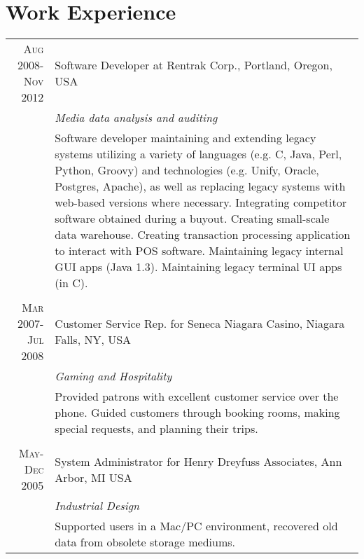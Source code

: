 \documentclass[a4paper,10pt]{article}
\begin{document}
        \section{Work Experience}
        \begin{tabular}{r|p{11cm}}
            \textsc{Aug 2008-Nov 2012}  & Software Developer at Rentrak Corp., Portland, Oregon, USA\\
                                        & \emph{Media data analysis and auditing}\\
                                        & \fontsize{9pt}{10pt}\selectfont
                                                Software developer maintaining and extending legacy systems utilizing a variety
                                                of languages (e.g. C, Java, Perl, Python, Groovy) and technologies (e.g. Unify,
                                                Oracle, Postgres, Apache), as well as replacing legacy systems with web-based
                                                versions where necessary. Integrating competitor software obtained during a
                                                buyout. Creating small-scale data warehouse. Creating transaction processing
                                                application to interact with POS software. Maintaining legacy internal GUI apps
                                                (Java 1.3). Maintaining legacy terminal UI apps (in C). \\
        \multicolumn{2}{c}{}\\
            \textsc{Mar 2007-Jul 2008}   & Customer Service Rep. for Seneca Niagara Casino, Niagara Falls, NY, USA\\
                                            &\emph{Gaming and Hospitality}\\
                                            & \fontsize{9pt}{10pt}\selectfont
                                                            Provided patrons with excellent customer service over the phone. Guided
                                                            customers through booking rooms, making special requests, and planning their
                                                            trips.\\
        \multicolumn{2}{c}{}\\
            \textsc{May-Dec 2005}   & System Administrator for Henry Dreyfuss Associates, Ann Arbor, MI USA\\
                                    &\emph{Industrial Design}\\
                                    & \fontsize{9pt}{10pt}\selectfont
                                                            Supported users in a Mac/PC environment, recovered old data from obsolete
                                                            storage mediums.\\
        \end{tabular}
    
\end{document}
